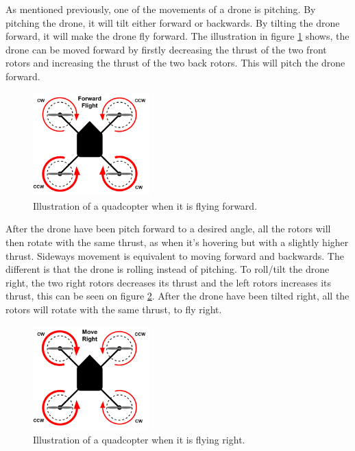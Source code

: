 As mentioned previously, one of the movements of a drone is pitching. By pitching the drone, it will tilt either forward or backwards. By tilting the drone forward, it will make the drone fly forward. The illustration in figure \ref{fig:dronePhysics_2} shows, the drone can be moved forward by firstly decreasing the thrust of the two front rotors and increasing the thrust of the two back rotors. This will pitch the drone forward.
\begin{figure}[H]
    \centering
    \includegraphics[width=0.4\textwidth]{figures/ch_intro/physics-of-multirotor-2.png}
    \caption{Illustration of a quadcopter when it is flying forward.}
    \label{fig:dronePhysics_2}
\end{figure}
After the drone have been pitch forward to a desired angle, all the rotors will then rotate with the same thrust, as when it's hovering but with a slightly higher thrust\cite{PhysicsofDroneFlight}.
\newline
Sideways movement is equivalent to moving forward and backwards. The different is that the drone is rolling instead of pitching. To roll/tilt the drone right, the two right rotors decreases its thrust and the left rotors increases its thrust, this can be seen on figure \ref{fig:dronePhysics_3}. After the drone have been tilted right, all the rotors will rotate with the same thrust, to fly right. 
\begin{figure}[H]
    \centering
    \includegraphics[width=0.4\textwidth]{figures/ch_intro/physics-of-multirotor-3.png}
    \caption{Illustration of a quadcopter when it is flying right.}
    \label{fig:dronePhysics_3}
\end{figure}

